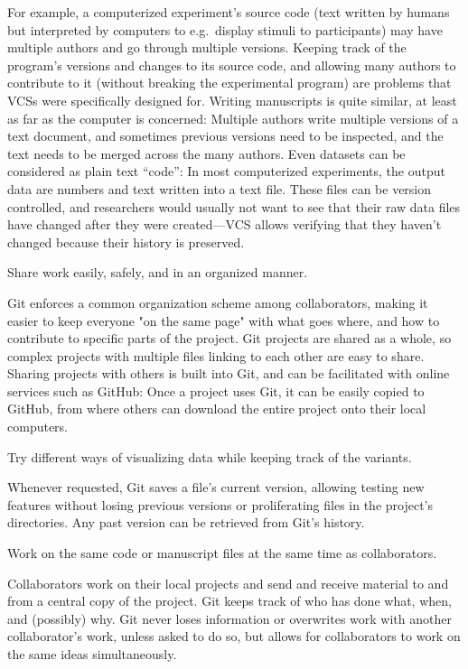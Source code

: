 \documentclass[
  american,
  ,doc,floatsintext]{apa6}
\begin{document}
For example, a computerized experiment's source code (text written by humans but interpreted by computers to e.g.~display stimuli to participants) may have multiple authors and go through multiple versions. Keeping track of the program's versions and changes to its source code, and allowing many authors to contribute to it (without breaking the experimental program) are problems that VCSs were specifically designed for. Writing manuscripts is quite similar, at least as far as the computer is concerned: Multiple authors write multiple versions of a text document, and sometimes previous versions need to be inspected, and the text needs to be merged across the many authors. Even datasets can be considered as plain text ``code'': In most computerized experiments, the output data are numbers and text written into a text file. These files can be version controlled, and researchers would usually not want to see that their raw data files have changed after they were created---VCS allows verifying that they haven't changed because their history is preserved.

\begin{tcolorbox}[colframe=green!50!black, colback=green!5, fonttitle=\small\bfseries, fontupper=\small, title=Box 1. How Git facilitates the scientific workflow.]
Share work easily, safely, and in an organized manner.
    \begin{compactitem}
    \item Git enforces a common organization scheme among collaborators, making it easier to keep everyone "on the same page" with what goes where, and how to contribute to specific parts of the project. Git projects are shared as a whole, so complex projects with multiple files linking to each other are easy to share. Sharing projects with others is built into Git, and can be facilitated with online services such as GitHub: Once a project uses Git, it can be easily copied to GitHub, from where others can download the entire project onto their local computers.
    \end{compactitem}
\vspace{.5em}
Try different ways of visualizing data while keeping track of the variants.
    \begin{compactitem}
    \item Whenever requested, Git saves a file's current version, allowing testing new features without losing previous versions or proliferating files in the project's directories. Any past version can be retrieved from Git's history. 
    \end{compactitem}
\vspace{.5em}
Work on the same code or manuscript files at the same time as collaborators.
    \begin{compactitem}
    \item Collaborators work on their local projects and send and receive material to and from a central copy of the project. Git keeps track of who has done what, when, and (possibly) why. Git never loses information or overwrites work with another collaborator's work, unless asked to do so, but allows for collaborators to work on the same ideas simultaneously. 
    \end{compactitem}
\end{tcolorbox}
\end{document}
